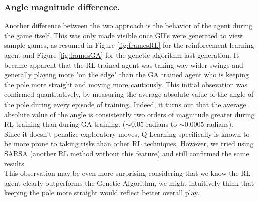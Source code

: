 \subsubsection{Angle magnitude difference.}
Another difference between the two approach is the behavior of the agent during the game itself.
This was only made visible once GIFs were generated to view sample games, as resumed in Figure \ref{fig:framesRL} for the reinforcement learning agent and Figure \ref{fig:framesGA} for the genetic algorithm last generation. 
It became apparent that the RL trained agent was taking way wider swings and generally playing more "on the edge" than the GA trained agent who is keeping the pole more straight and moving more cautiously.
This initial obsevation was confirmed quantitatively, by measuring the average absolute value of the angle of the pole during every episode of training.
Indeed, it turns out that the average absolute value of the angle is consistently two orders of magnitude greater during RL training than during GA training. ($ \sim 0.05$ radians to $\sim 0.0005$ radians).
\\
Since it doesn't penalize exploratory moves, Q-Learning specifically is known to be more prone to taking risks than other RL techniques. 
However, we tried using SARSA (another RL method without this feature) and still confirmed the same results.
\\
This observation may be even more surprising considering that we know the RL agent clearly outperforms the Genetic Algorithm, we might intuitively think that keeping the pole more straight would reflect better overall play.



